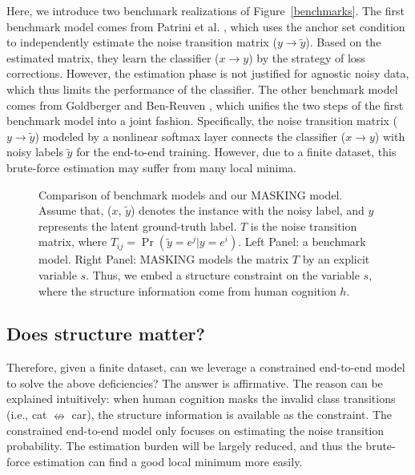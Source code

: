 \documentclass{article}
\begin{document}
Here, we introduce two benchmark realizations of Figure~\ref{benchmarks}. The first benchmark model comes from Patrini et al. \cite{patrini2017making}, which uses the anchor set condition \cite{webvision} to independently estimate the noise transition matrix ($y \rightarrow \tilde{y}$). Based on the estimated matrix, they learn the classifier ($x \rightarrow y$) by the strategy of loss corrections. However, the estimation phase is not justified for agnostic noisy data, which thus limits the performance of the classifier. The other benchmark model comes from Goldberger and Ben-Reuven \cite{goldberger2016training}, which unifies the two steps of the first benchmark model into a joint fashion. Specifically, the noise transition matrix ($y \rightarrow \tilde{y}$) modeled by a nonlinear softmax layer connects the classifier ($x \rightarrow y$) with noisy labels $\tilde{y}$ for the end-to-end training. However, due to a finite dataset, this brute-force estimation may suffer from many local minima.



\begin{figure}[!tp]
\begin{center}
 \hspace{1cm}
\caption{Comparison of benchmark models and our MASKING model. Assume that, ($x$, $\tilde{y}$) denotes the instance with the noisy label, and $y$ represents the latent ground-truth label. $T$ is the noise transition matrix, where $T_{ij} = \Pr(\tilde{y} = e^j|y = e^i)$. Left Panel: a benchmark model. Right Panel: MASKING models the matrix $T$ by an explicit variable $s$. Thus, we embed a structure constraint on the variable $s$, where the structure information come from human cognition $h$.}
\label{Prior-Matters-motivation}
\end{center}
\end{figure}

\subsection{Does structure matter?}\label{V-Belief-AutoEncoder}
Therefore, given a finite dataset, can we leverage a constrained end-to-end model to solve the above deficiencies? The answer is affirmative. The reason can be explained intuitively: when human cognition masks the invalid class transitions (i.e., cat $\nleftrightarrow$ car), the structure information is available as the constraint. The constrained end-to-end model only focuses on estimating the noise transition probability. The estimation burden will be largely reduced, and thus the brute-force estimation can find a good local minimum more easily.
\end{document}
